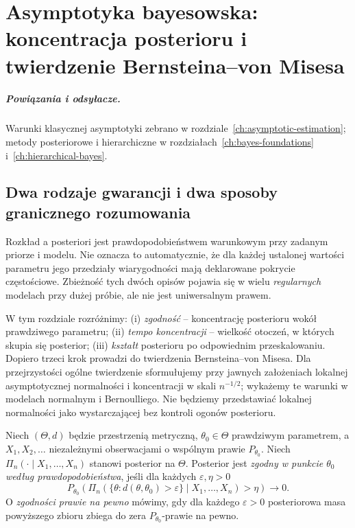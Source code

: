\chapter{Asymptotyka bayesowska: koncentracja posterioru i twierdzenie Bernsteina--von Misesa}
\label{ch:bayesian-asymptotics}
\paragraph{Powiązania i odsyłacze.} Warunki klasycznej asymptotyki zebrano w rozdziale~\ref{ch:asymptotic-estimation}; metody posteriorowe i hierarchiczne w rozdziałach~\ref{ch:bayes-foundations} i~\ref{ch:hierarchical-bayes}.


\section{Dwa rodzaje gwarancji i dwa sposoby granicznego rozumowania}
Rozkład a posteriori jest prawdopodobieństwem warunkowym przy
zadanym priorze i modelu. Nie oznacza to automatycznie, że dla
każdej ustalonej wartości parametru jego przedziały wiarygodności
mają deklarowane pokrycie częstościowe. Zbieżność tych dwóch
opisów pojawia się w wielu \emph{regularnych} modelach przy dużej
próbie, ale nie jest uniwersalnym prawem.

W tym rozdziale rozróżnimy: (i) \emph{zgodność} -- koncentrację
posterioru wokół prawdziwego parametru; (ii) \emph{tempo koncentracji}
-- wielkość otoczeń, w których skupia się posterior;
(iii) \emph{kształt} posterioru po odpowiednim przeskalowaniu.
Dopiero trzeci krok prowadzi do twierdzenia Bernsteina--von Misesa.
Dla przejrzystości ogólne twierdzenie sformułujemy przy jawnych
założeniach lokalnej asymptotycznej normalności i koncentracji
w skali $n^{-1/2}$; wykażemy te warunki w modelach normalnym
i Bernoulliego. Nie będziemy przedstawiać lokalnej normalności
jako wystarczającej bez kontroli ogonów posterioru.

\begin{definicja}
\label{def:posterior-consistency}
Niech $(\Theta,d)$ będzie przestrzenią metryczną,
$\theta_0\in\Theta$ prawdziwym parametrem, a
$X_1,X_2,\ldots$ niezależnymi obserwacjami o wspólnym
prawie $P_{\theta_0}$. Niech $\Pi_n(\cdot\mid X_1,\ldots,X_n)$
stanowi posterior na $\Theta$.
Posterior jest \emph{zgodny w punkcie $\theta_0$ według
prawdopodobieństwa}, jeśli dla każdych $\varepsilon,\eta>0$
\[
 P_{\theta_0}\!\left(
 \Pi_n(\{\theta:d(\theta,\theta_0)>\varepsilon\}\mid X_1,\ldots,X_n)
 >\eta\right)\longrightarrow0.
\]
O \emph{zgodności prawie na pewno} mówimy, gdy dla każdego
$\varepsilon>0$ posteriorowa masa powyższego zbioru
zbiega do zera $P_{\theta_0}$-prawie na pewno.
\end{definicja}

